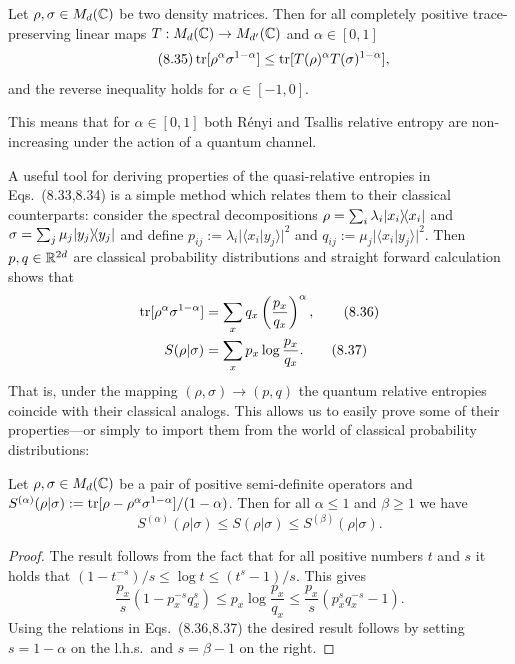 \documentclass[11pt,a4paper]{article}
\theoremstyle{plain}
\theoremstyle{definition}
\theoremstyle{remark}
\begin{document}
\begin{theorem}
    Let $\rho,\sigma\in M_d(\mathbb{C})$ be two density matrices. Then for all completely positive trace-preserving linear maps
    $T:M_d(\mathbb{C})\to M_{d'}(\mathbb{C})$ and $\alpha\in[0,1]$
    \begin{equation}\tag{8.35}
        \operatorname{tr}[\rho^\alpha\sigma^{1-\alpha}] \le \operatorname{tr}[T(\rho)^\alpha T(\sigma)^{1-\alpha}],
    \end{equation}
    and the reverse inequality holds for $\alpha\in[-1,0]$.
\end{theorem}

This means that for $\alpha\in[0,1]$ both R\'enyi and Tsallis relative entropy are non-increasing under the action of a quantum channel.

A useful tool for deriving properties of the quasi-relative entropies in Eqs.~(8.33,8.34) is a simple method which relates them to their
classical counterparts: consider the spectral decompositions $\rho=\sum_i \lambda_i|x_i\rangle\!\langle x_i|$ and
$\sigma=\sum_j \mu_j |y_j\rangle\!\langle y_j|$ and define $p_{ij}:=\lambda_i|\langle x_i|y_j\rangle|^2$ and
$q_{ij}:=\mu_j|\langle x_i|y_j\rangle|^2$. Then $p,q\in\mathbb{R}^{2d}$ are classical probability distributions and straight forward calculation shows that
\begin{align}
    \operatorname{tr}[\rho^\alpha\sigma^{1-\alpha}] &= \sum_x q_x\left(\frac{p_x}{q_x}\right)^\alpha, \tag{8.36}\\
    S(\rho|\sigma)                    &= \sum_x p_x \log\frac{p_x}{q_x}. \tag{8.37}
\end{align}
That is, under the mapping $(\rho,\sigma)\to(p,q)$ the quantum relative entropies coincide with their classical analogs. This allows us to easily prove some
of their properties---or simply to import them from the world of classical probability distributions:

\begin{theorem}
    Let $\rho,\sigma\in M_d(\mathbb{C})$ be a pair of positive semi-definite operators and
    $S^{(\alpha)}(\rho|\sigma):=\operatorname{tr}[\rho-\rho^\alpha\sigma^{1-\alpha}]/(1-\alpha)$. Then for all $\alpha\le 1$ and $\beta\ge 1$ we have
    \begin{equation}\tag{8.38}
        S^{(\alpha)}(\rho|\sigma)\le S(\rho|\sigma)\le S^{(\beta)}(\rho|\sigma).
    \end{equation}
\end{theorem}

\begin{proof}
    The result follows from the fact that for all positive numbers $t$ and $s$ it holds that $(1-t^{-s})/s \le \log t \le (t^s-1)/s$.
    This gives
    \begin{equation}\tag{8.39}
        \frac{p_x}{s}\left(1-p_x^{-s}q_x^{s}\right)
        \le p_x\log\frac{p_x}{q_x}
        \le \frac{p_x}{s}\left(p_x^{s}q_x^{-s}-1\right).
    \end{equation}
    Using the relations in Eqs.~(8.36,8.37) the desired result follows by setting $s=1-\alpha$ on the l.h.s.\ and $s=\beta-1$ on the right.
\end{proof}
\end{document}
